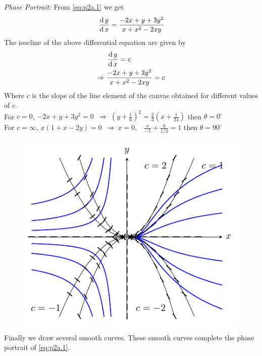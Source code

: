 \documentclass[../main-sheet.tex]{subfiles}
\begin{document}
\begin{soln}[a]
    \emph{Phase Portrait:} From \eqref{eq:p2a.1} we get
    \[\,\frac{\mathrm{d}\,y}{\mathrm{d}\,x}=\frac{-2x+y+3y^2}{x+x^2-2xy}\]
    The isocline of the above differential equation are given by
    \begin{align*}
        &\,\frac{\mathrm{d}\,y}{\mathrm{d}\,x}=c\\
        \Rightarrow\;&\frac{-2x+y+3y^2}{x+x^2-2xy}=c
    \end{align*}
    Where \(c\) is the slope of the line element of the canvas obtained for different values of \(c\).\\
    For \(c=0\), \(-2x+y+3y^2=0\;\;\Rightarrow\;\left( y+\frac{1}{6} \right)^2=\frac{2}{3}\left( x+\frac{1}{24} \right)\) then \(\theta=0^{\circ}\)\\
    For \(c=\infty\), \(x(1+x-2y)=0\;\;\Rightarrow\,x=0,\;\;\;\frac{x}{-1}+\frac{y}{1/3}=1\) then \(\theta=90^{\circ}\)
    \begin{figure}[H]
        \centering
        \includegraphics[scale=2]{pr3.pdf}
    \end{figure}
    Finally we draw several smooth curves. These smooth curves complete the phase portrait of \eqref{eq:p2a.1}.
\end{soln}
\end{document}
